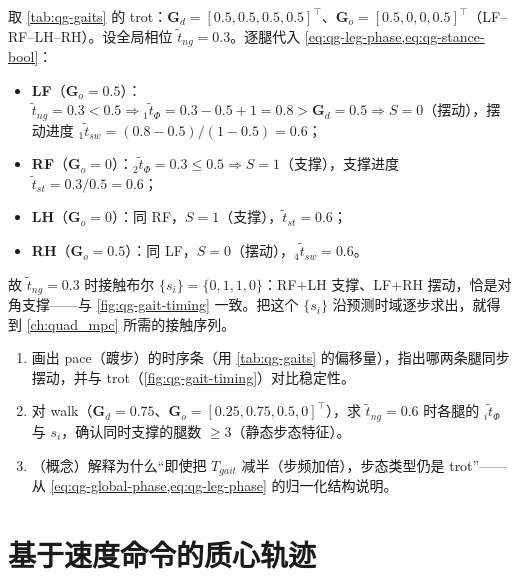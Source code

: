 \begin{example}[读时序：trot 在 $\tilde t_{ng}=0.3$ 时各腿状态]\label{exam:qg-read-timing}
取 \cref{tab:qg-gaits} 的 trot：$\mathbf{G}_d=[0.5,0.5,0.5,0.5]^\top$、$\mathbf{G}_o=[0.5,0,0,0.5]^\top$（LF–RF–LH–RH）。设全局相位 $\tilde t_{ng}=0.3$。逐腿代入 \cref{eq:qg-leg-phase,eq:qg-stance-bool}：
\begin{itemize}
  \item \textbf{LF}（$\mathbf{G}_o=0.5$）：$\tilde t_{ng}=0.3<0.5\Rightarrow {}_1\tilde t_\Phi=0.3-0.5+1=0.8>\mathbf{G}_d=0.5\Rightarrow S=0$（摆动），摆动进度 ${}_1\tilde t_{sw}=(0.8-0.5)/(1-0.5)=0.6$；
  \item \textbf{RF}（$\mathbf{G}_o=0$）：${}_2\tilde t_\Phi=0.3\le0.5\Rightarrow S=1$（支撑），支撑进度 $\tilde t_{st}=0.3/0.5=0.6$；
  \item \textbf{LH}（$\mathbf{G}_o=0$）：同 RF，$S=1$（支撑），$\tilde t_{st}=0.6$；
  \item \textbf{RH}（$\mathbf{G}_o=0.5$）：同 LF，$S=0$（摆动），${}_4\tilde t_{sw}=0.6$。
\end{itemize}
故 $\tilde t_{ng}=0.3$ 时接触布尔 $\{s_i\}=\{0,1,1,0\}$：RF+LH 支撑、LF+RH 摆动，恰是对角支撑——与 \cref{fig:qg-gait-timing} 一致。把这个 $\{s_i\}$ 沿预测时域逐步求出，就得到 \cref{ch:quad_mpc} 所需的接触序列。
\end{example}

\begin{practice}
\begin{enumerate}
  \item 画出 pace（踱步）的时序条（用 \cref{tab:qg-gaits} 的偏移量），指出哪两条腿同步摆动，并与 trot（\cref{fig:qg-gait-timing}）对比稳定性。
  \item 对 walk（$\mathbf{G}_d=0.75$、$\mathbf{G}_o=[0.25,0.75,0.5,0]^\top$），求 $\tilde t_{ng}=0.6$ 时各腿的 ${}_i\tilde t_\Phi$ 与 $s_i$，确认同时支撑的腿数 $\ge3$（静态步态特征）。
  \item （概念）解释为什么“即使把 $T_{gait}$ 减半（步频加倍），步态类型仍是 trot”——从 \cref{eq:qg-global-phase,eq:qg-leg-phase} 的归一化结构说明。
\end{enumerate}
\end{practice}

\section{基于速度命令的质心轨迹}
\label{sec:qg-com}

